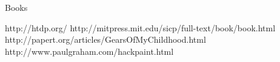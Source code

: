 \begin{rubric}{Books} 
\end{rubric}

\begin{center}
                    {http://htdp.org/}
                    {http://mitpress.mit.edu/sicp/full-text/book/book.html}
                    {http://papert.org/articles/GearsOfMyChildhood.html}
                    {http://www.paulgraham.com/hackpaint.html}

\end{center}
